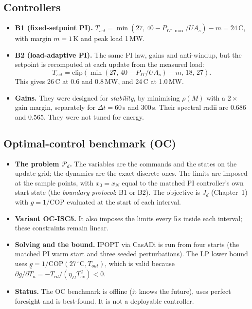 \documentclass[12pt,a4paper]{report}
\theoremstyle{definition}
\newcommand{\COP}{\mathrm{COP}}
\begin{document}
\subsection*{Controllers}
\begin{itemize}
\item \textbf{B1 (fixed-setpoint PI).} $T_{set}=\min(27,\,40-P_{IT,\max}/UA_s)-m=24$\,\textdegree C, with margin $m=1$\,K and peak load 1\,MW.
\item \textbf{B2 (load-adaptive PI).} The same PI law, gains and anti-windup, but the setpoint is recomputed at each update from the measured load:
\[
T_{set}=\mathrm{clip}(\min(27,\,40-P_{IT}/UA_s)-m,\,18,\,27).
\]
This gives 26\,\textdegree C at 0.6 and 0.8\,MW, and 24\,\textdegree C at 1.0\,MW.
\item \textbf{Gains.} They were designed for \emph{stability}, by minimising $\rho(M)$ with a $2\times$ gain margin, separately for $\Delta t=60$\,s and $300$\,s. Their spectral radii are $0.686$ and $0.565$. They were not tuned for energy.
\end{itemize}

\subsection*{Optimal-control benchmark (OC)}
\begin{itemize}
\item \textbf{The problem $\mathcal P_d$.} The variables are the commands and the states on the update grid; the dynamics are the exact discrete ones. The limits are imposed at the sample points, with $x_0=x_N$ equal to the matched PI controller's own start state (the \emph{boundary protocol}: B1 or B2). The objective is $J_d$ (Chapter~1) with $g=1/\COP$ evaluated at the start of each interval.
\item \textbf{Variant OC-ISC5.} It also imposes the limits every 5\,s inside each interval; these constraints remain linear.
\item \textbf{Solving and the bound.} IPOPT via CasADi is run from four starts (the matched PI warm start and three seeded perturbations). The LP lower bound uses $\underline g=1/\COP(27\,^\circ\mathrm{C},T_{out})$, which is valid because $\partial g/\partial T_a=-T_{cd}/(\eta_{II}T_{ev}^2)<0$.
\item \textbf{Status.} The OC benchmark is offline (it knows the future), uses perfect foresight and is best-found. It is not a deployable controller.
\end{itemize}
\end{document}

